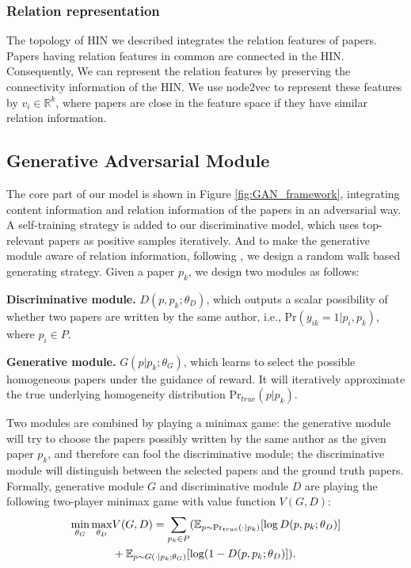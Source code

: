 \documentclass[letterpaper]{article}
\begin{document}
\subsubsection{Relation representation} \label{sec:relation}
The topology of HIN we described integrates the relation features of papers.
Papers having relation features in common are connected in the HIN.
Consequently, We can represent the relation features by preserving the connectivity information of the HIN.
We use node2vec \cite{Node2vec} to represent these features by $v_i \in \mathbb{R}^k$, where papers are close in the feature space if they have similar relation information.

\subsection{Generative Adversarial Module}

The core part of our model is shown in Figure \ref{fig:GAN_framework}, integrating content information and relation information of the papers in an adversarial way.
A self-training strategy is added to our discriminative model, which uses top-relevant papers as positive samples iteratively.
And to make the generative module aware of relation information, following \cite{GraphGAN}, we design a random walk based generating strategy.
Given a paper $p_k$, we design two modules as follows:

\vspace*{1pt}
\textbf{Discriminative module.} $D(p, p_k; \theta_D)$, which outputs a scalar possibility of whether two papers are written by the same author, i.e., $\text{Pr}(y_{ik}=1|p_i,p_k)$, where $p_i \in P$.

\vspace*{2pt}
\textbf{Generative module.} $G(p|p_k; \theta_G)$, which learns to select the possible homogeneous papers under the guidance of reward. It will iteratively approximate the true underlying homogeneity distribution $\text{Pr}_{true}(p|p_k)$.

Two modules are combined by playing a minimax game:
the generative module will try to choose the papers possibly written by the same author as the given paper $p_k$, and therefore can fool the discriminative module;
the discriminative module will distinguish between the selected papers and the ground truth papers.
Formally, generative module $G$ and discriminative module $D$ are playing the following two-player minimax game with value function $V(G, D)$:
\begin{equation}
\begin{split}
\small
\min_{\theta_G}  \max_{\theta_D} & V(G, D) = \sum_{p_k \in P} (\mathbb{E}_{p \sim \text{Pr}_{true}(\cdot|p_k)}[\log D(p, p_k; \theta_D)] \\
&+ \mathbb{E}_{p \sim G(\cdot|p_k;\theta_G)} [\log(1-D(p, p_k; \theta_D)]).
\label{eq:minimax}
\end{split}
\end{equation}
\end{document}
